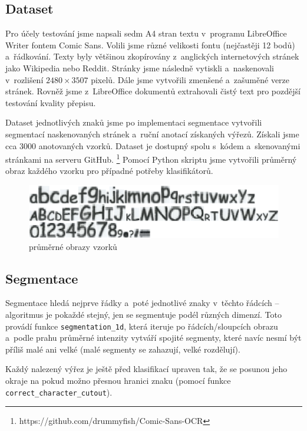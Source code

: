\documentclass[12pt]{article}
\begin{document}
\subsection{Dataset}
\label{sec:dataset}

Pro účely testování jsme napsali sedm A4 stran textu v~programu LibreOffice Writer fontem Comic Sans. Volili jsme
různé velikosti fontu (nejčastěji 12 bodů) a~řádkování. Texty byly většinou zkopírovány z~anglických internetových
stránek jako Wikipedia nebo Reddit. Stránky jsme následně vytiskli a~naskenovali v~rozlišení $2480 \times 3507$ pixelů.
Dále jsme vytvořili zmenšené a~zašuměné verze stránek. Rovněž jsme z~LibreOffice dokumentů extrahovali čistý text
pro pozdější testování kvality přepisu.

Dataset jednotlivých znaků jsme po implementaci segmentace vytvořili segmentací naskenovaných stránek a~ruční
anotací získaných výřezů. Získali jsme cca 3000 anotovaných vzorků. Dataset je dostupný spolu s~kódem a~skenovanými stránkami
na serveru GitHub. \footnote{https://github.com/drummyfish/Comic-Sans-OCR} Pomocí Python skriptu jsme
vytvořili průměrný obraz každého vzorku pro případné potřeby klasifikátorů.

\begin{figure}[htb]
  \centering
  \includegraphics[width=13.5cm,keepaspectratio]{averages.png}
  \caption{průměrné obrazy vzorků}
  \label{fig:avg}
\end{figure}

\subsection{Segmentace}

Segmentace hledá nejprve řádky a~poté jednotlivé znaky v~těchto řádcích -- algoritmus je pokaždé stejný, jen
se segmentuje podél různých dimenzí. Toto provádí funkce {\tt segmentation\_1d}, která iteruje po
řádcích/sloupcích obrazu a~podle prahu průměrné intenzity vytváří spojité segmenty, které navíc nesmí být příliš malé
ani velké (malé segmenty se zahazují, velké rozdělují).

Každý nalezený výřez je ještě před klasifikací upraven tak, že se posunou jeho okraje na pokud možno přesnou hranici znaku
(pomocí funkce {\tt correct\_character\_cutout}).
\end{document}
